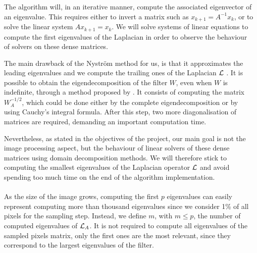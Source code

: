 The algorithm will, in an iterative manner, compute the associated eigenvector of an eigenvalue.
This requires either to invert a matrix such as \(x_{k+1} = A^{-1} x_k\), or to solve the linear system \(A x_{k+1} = x_k\).
We will solve systems of linear equations to compute the first eigenvalues of the Laplacian in order to observe the behaviour of solvers on these dense matrices.

The main drawback of the Nystr\"om method for us, is that it approximates the leading eigenvalues and we compute the trailing ones of the Laplacian \(\operatorname{\mathcal{L}}\) \cite{belongie_spectral_2002}.
It is possible to obtain the eigendecomposition of the filter \(W\), even when \(W\) is indefinite, through a method proposed by \cite{fowlkes_spectral_2004}.
It consists of computing the matrix \(W_A^{-1/2}\), which could be done either by the complete eigendecomposition or by using Cauchy's integral formula.
After this step, two more diagonalisation of matrices are required, demanding an important computation time.

Nevertheless, as stated in the objectives of the project, our main goal is not the image processing aspect, but the behaviour of linear solvers of these dense matrices using domain decomposition methods.
We will therefore stick to computing the smallest eigenvalues of the Laplacian operator \(\operatorname{\mathcal{L}}\) and avoid spending too much time on the end of the algorithm implementation.

\paragraph{}
As the size of the image grows, computing the first \(p\) eigenvalues can easily represent computing more than thousand eigenvalues since we consider 1\% of all pixels for the sampling step.
Instead, we define \(m\), with \(m \le p\), the number of computed eigenvalues of \(\operatorname{\mathcal{L}}_A\).
It is not required to compute all eigenvalues of the sampled pixels matrix, only the first ones are the most relevant, since they correspond to the largest eigenvalues of the filter.

